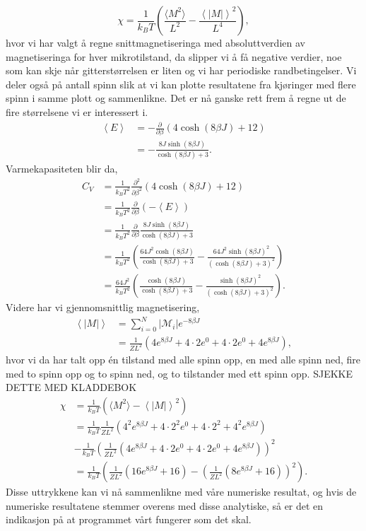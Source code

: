 \documentclass[norsk, 10pt]{article}
\def\mean#1{\left\langle #1 \right\rangle}
\def\para#1{\left( #1 \right)}
\begin{document}
$$ \chi = \frac{1}{k_BT}\para{\frac{\langle M^2\rangle}{L^2} - \frac{\mean{|M|}^2}{L^4}},$$
hvor vi har valgt å regne snittmagnetiseringa med absoluttverdien av magnetiseringa for hver mikrotilstand, da slipper vi å få negative verdier, noe som kan skje når gitterstørrelsen er liten og vi har periodiske randbetingelser. Vi deler også på antall spinn slik at vi kan plotte resultatene fra kjøringer med flere spinn i samme plott og sammenlikne. Det er nå ganske rett frem å regne ut de fire størrelsene vi er interessert i.
\begin{align*}
	\mean E &= -\frac{\partial}{\partial \beta} (4\cosh(8\beta J) + 12) \\
	&= -\frac{8J\sinh(8\beta J)}{\cosh(8\beta J) + 3}.
\end{align*}
Varmekapasiteten blir da,
\begin{align*}
	C_V &= \frac{1}{k_BT^2}\frac{\partial^2}{\partial \beta^2} (4\cosh(8\beta J) + 12) \\
	&= \frac{1}{k_BT^2}\frac{\partial}{\partial \beta} (-\mean E) \\
	&= \frac{1}{k_BT^2}\frac{\partial}{\partial \beta}\frac{8J\sinh(8\beta J)}{\cosh(8\beta J) + 3} \\
	&= \frac{1}{k_BT^2}\para{\frac{64J^2\cosh(8\beta J)}{\cosh(8\beta J) + 3} - \frac{64J^2\sinh(8\beta J)^2}{(\cosh(8\beta J) + 3)^2}} \\
	&= \frac{64J^2}{k_BT^2}\para{\frac{\cosh(8\beta J)}{\cosh(8\beta J) + 3} - \frac{\sinh(8\beta J)^2}{(\cosh(8\beta J) + 3)^2}}.
\end{align*}
Videre har vi gjennomsnittlig magnetisering,
\begin{align*}
	\mean{|M|} &= \sum\limits_{i=0}^N |\mathcal M_i|e^{-8\beta J} \\
	&= \frac{1}{ZL^2}\para{4e^{8\beta J} + 4\cdot 2e^{0} + 4\cdot 2e^{0} + 4e^{8\beta J}},
\end{align*}
hvor vi da har talt opp én tilstand med alle spinn opp, en med alle spinn ned, fire med to spinn opp og to spinn ned, og to tilstander med ett spinn opp. SJEKKE DETTE MED KLADDEBOK
\begin{align*}
	\chi &= \frac{1}{k_BT}\para{\langle M^2\rangle - \mean{|M|}^2} \\
	&= \frac{1}{k_BT}\frac{1}{ZL^2}\para{4^2e^{8\beta J} + 4\cdot2^2e^0 + 4\cdot2^2 + 4^2e^{8\beta J}} \\
	&- \frac{1}{k_BT}\para{ \frac{1}{ZL^2}\para{4e^{8\beta J} + 4\cdot 2e^{0} + 4\cdot 2e^{0} + 4e^{8\beta J}}}^2 \\
	&= \frac{1}{k_BT}\para{\frac{1}{ZL^2}\para{16e^{8\beta J} + 16} - \para{ \frac{1}{ZL^2}\para{8e^{8\beta J} + 16}}^2}.
\end{align*}
Disse uttrykkene kan vi nå sammenlikne med våre numeriske resultat, og hvis de numeriske resultatene stemmer overens med disse analytiske, så er det en indikasjon på at programmet vårt fungerer som det skal.
\end{document}
